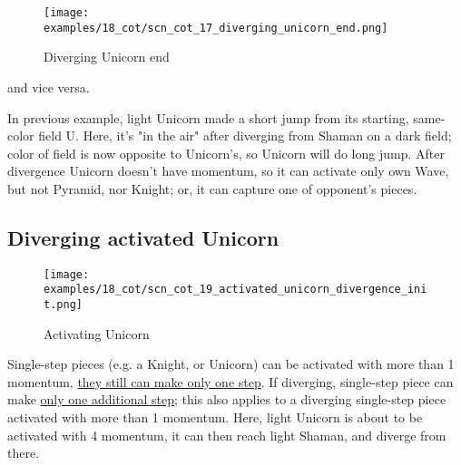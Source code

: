 \clearpage %

\vspace*{-2.1\baselineskip}
\noindent
\begin{figure}[!h]
\texttt{[image: examples/18\_cot/scn\_cot\_17\_diverging\_unicorn\_end.png]}
\vspace*{-1.3\baselineskip}
\caption{Diverging Unicorn end}
\label{fig:scn_cot_17_diverging_unicorn_end}
\end{figure}

\vspace*{-0.4\baselineskip}
\noindent
and vice versa.

In previous example, light Unicorn made a short jump from its starting, same-color
field U. Here, it's "in the air" after diverging from Shaman on a dark field; color
of field is now opposite to Unicorn's, so Unicorn will do long jump.
After divergence Unicorn doesn't have momentum, so it can activate only own Wave,
but not Pyramid, nor Knight; or, it can capture one of opponent's pieces.

\clearpage %

\subsection*{Diverging activated Unicorn}
\label{sec:Conquest of Tlalocan/Divergence/Diverging activated Unicorn}

\vspace*{-1.4\baselineskip}
\noindent
\begin{figure}[!h]
\texttt{[image: examples/18\_cot/scn\_cot\_19\_activated\_unicorn\_divergence\_init.png]}
\vspace*{-1.3\baselineskip}
\caption{Activating Unicorn}
\label{fig:scn_cot_19_activated_unicorn_divergence_init}
\end{figure}

\vspace*{-0.5\baselineskip}
Single-step pieces (e.g. a Knight, or Unicorn) can be activated with more than 1 momentum,
\hyperref[fig:scn_mv_32_single_step_piece_momentum]{they still can make only one step}.
If diverging, single-step piece can make
\hyperref[fig:scn_cot_16_diverging_unicorn_init]{only one additional step}; this also
applies to a diverging single-step piece activated with more than 1 momentum. \newline
\indent
Here, light Unicorn is about to be activated with 4 momentum, it can then reach light
Shaman, and diverge from there.

